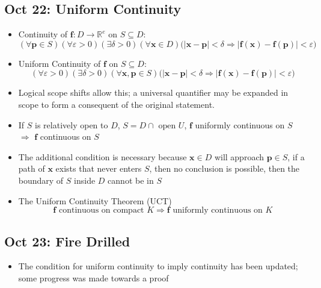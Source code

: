 \documentclass[10pt, oneside]{article}
\newcommand{\R}{\mathbb{R}}
\renewcommand{\vec}[1]{\mathbf{#1}}
\newcommand{\vecf}[1]{\boldsymbol{#1}}
\begin{document}
\subsection{Oct 22: Uniform Continuity}
\begin{itemize}
    \item Continuity of $\vecf{f} : D \rightarrow \R^e$ on $S \subseteq D$:
        \[(\forall \vec{p} \in S)(\forall \varepsilon > 0)(\exists \delta > 0)(\forall \vec{x} \in D) \big( |\vec{x} - \vec{p}| < \delta \Rightarrow |\vecf{f}(\vec{x}) - \vecf{f}(\vec{p})| < \varepsilon \big)\]
    \item Uniform Continuity of $\vecf{f}$ on $S \subseteq D$:
        \[(\forall \varepsilon > 0)(\exists \delta > 0)(\forall \vec{x}, \vec{p} \in S) \big( |\vec{x} - \vec{p}| < \delta \Rightarrow |\vecf{f}(\vec{x}) - \vecf{f}(\vec{p})| < \varepsilon \big)\]
    \item Logical scope shifts allow this; a universal quantifier may be expanded in scope to form a consequent of the original statement.
    \item If $S$ is relatively open to $D$, $S = D \cap \text{ open } U$, $\vecf{f}$ uniformly continuous on $S$ $\Rightarrow$ $\vecf{f}$ continuous on $S$
    \item The additional condition is necessary because $\vec{x} \in D$ will approach $\vec{p} \in S$, if a path of $\vec{x}$ exists that never enters $S$, then no conclusion is possible, then the boundary of $S$ inside $D$ cannot be in $S$
    \item The Uniform Continuity Theorem (UCT)
        \[\vecf{f} \text{ continuous on compact } K \Rightarrow \vecf{f} \text{ uniformly continuous on } K\]
\end{itemize}

\subsection{Oct 23: Fire Drilled}
\begin{itemize}
    \item The condition for uniform continuity to imply continuity has been updated; some progress was made towards a proof
\end{itemize}
\end{document}
